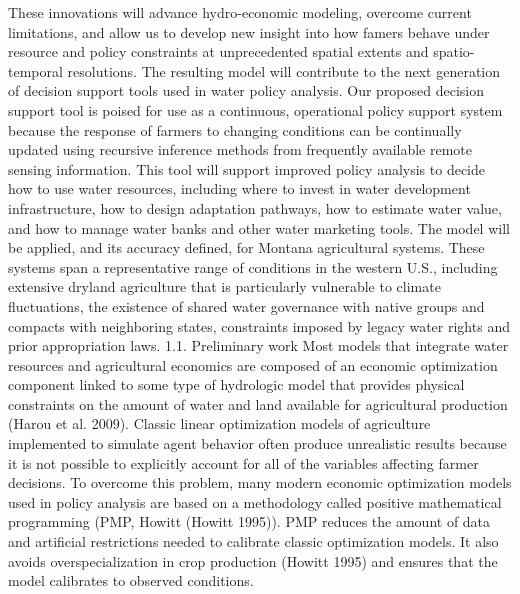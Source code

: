 \documentclass[review]{elsarticle}
\begin{document}
These innovations will advance hydro-economic modeling, overcome current limitations, and allow us to develop new insight into how famers behave under resource and policy constraints at unprecedented spatial extents and spatio-temporal resolutions. The resulting model will contribute to the next generation of decision support tools used in water policy analysis. Our proposed decision support tool is poised for use as a continuous, operational policy support system because the response of farmers to changing conditions can be continually updated using recursive inference methods from frequently available remote sensing information. This tool will support improved policy analysis to decide how to use water resources, including where to invest in water development infrastructure, how to design adaptation pathways, how to estimate water value, and how to manage water banks and other water marketing tools.
The model will be applied, and its accuracy defined, for Montana agricultural systems. These systems span a representative range of conditions in the western U.S., including extensive dryland agriculture that is particularly vulnerable to climate fluctuations, the existence of shared water governance with native groups and compacts with neighboring states, constraints imposed by legacy water rights and prior appropriation laws. 
1.1. Preliminary work 
Most models that integrate water resources and agricultural economics are composed of an economic optimization component linked to some type of hydrologic model that provides physical constraints on the amount of water and land available for agricultural production (Harou et al. 2009). Classic linear optimization models of agriculture implemented to simulate agent behavior often produce unrealistic results because it is not possible to explicitly account for all of the variables affecting farmer decisions. To overcome this problem, many modern economic optimization models used in policy analysis are based on a methodology called positive mathematical programming (PMP, Howitt (Howitt 1995)). PMP reduces the amount of data and artificial restrictions needed to calibrate classic optimization models. It also avoids overspecialization in crop production (Howitt 1995) and ensures that the model calibrates to observed conditions. 
\end{document}
